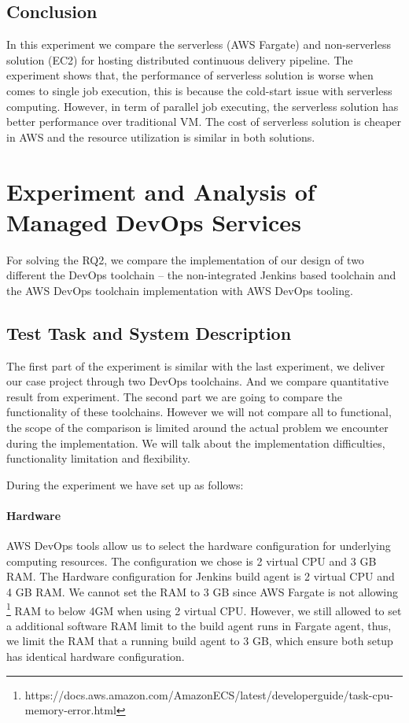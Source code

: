\subsection{Conclusion}
In this experiment we compare the serverless (AWS Fargate) and non-serverless solution (EC2) for hosting distributed continuous delivery pipeline. The experiment shows that, the performance of serverless solution is worse when comes to single job execution, this is because the cold-start issue with serverless computing. However, in term of parallel job executing, the serverless solution has better performance over traditional VM. The cost of serverless solution is cheaper in AWS and the resource utilization is similar in both solutions.
\section{Experiment and Analysis of Managed DevOps Services}
For solving the RQ2, we compare the implementation of our design of two different the DevOps toolchain -- the non-integrated Jenkins based toolchain and the AWS DevOps toolchain implementation with AWS DevOps tooling.
\subsection{Test Task and System Description}
The first part of the experiment is similar with the last experiment, we deliver our case project through two DevOps toolchains. And we compare quantitative result from experiment.
The second part we are going to compare the functionality of these toolchains. However we will not compare all to functional, the scope of the comparison is limited around the actual problem we encounter during the implementation.  We will talk about the implementation difficulties, functionality limitation and flexibility.
\par
During the experiment we have set up as follows:
\paragraph{Hardware}
AWS DevOps tools allow us to select the hardware configuration for underlying computing resources. The configuration we chose is 2 virtual CPU and 3 GB RAM.
The Hardware configuration for Jenkins build agent is 2 virtual CPU and 4 GB RAM. We cannot set the RAM to 3 GB since AWS Fargate is not allowing \footnote{https://docs.aws.amazon.com/AmazonECS/latest/developerguide/task-cpu-memory-error.html} RAM to below 4GM when using 2 virtual CPU. However, we still allowed to set a additional software RAM limit to the build agent runs in Fargate agent, thus, we limit the RAM that a running build agent to 3 GB, which ensure both setup has identical hardware configuration.
